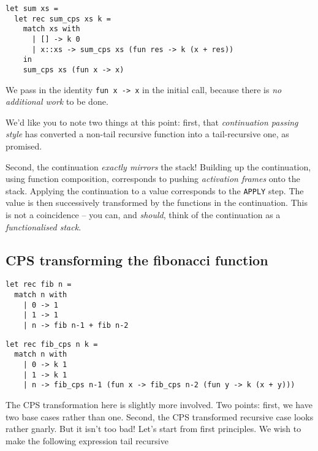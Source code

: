 \begin{code}
\label{code:sum-cps-wrapped-ocaml}
\begin{verbatim}
let sum xs = 
  let rec sum_cps xs k = 
    match xs with
      | [] -> k 0
      | x::xs -> sum_cps xs (fun res -> k (x + res))
    in
    sum_cps xs (fun x -> x)
\end{verbatim}
\end{code}

We pass in the identity \texttt{fun x -> x} in the initial call, because there is \emph{no additional work} to be done. 

We'd like you to note two things at this point: first, that \emph{continuation passing style} has converted a non-tail recursive function into a tail-recursive one, as promised. 

Second, the continuation \emph{exactly mirrors} the stack! Building up the continuation, using function composition, corresponds to pushing \emph{activation frames} onto the stack. Applying the continuation to a value corresponds to the \texttt{APPLY} step. The value is then successively transformed by the functions in the continuation. This is not a coincidence -- you can, and \emph{should}, think of the continuation as a \emph{functionalised stack}. 

\subsection{CPS transforming the fibonacci function}
\begin{code}
\label{code:fib-ocaml-again}
\begin{verbatim}
let rec fib n = 
  match n with
    | 0 -> 1
    | 1 -> 1
    | n -> fib n-1 + fib n-2
\end{verbatim}
\end{code}

\begin{code}
\label{code:fib-ocaml-again}
\begin{verbatim}
let rec fib_cps n k = 
  match n with
    | 0 -> k 1
    | 1 -> k 1
    | n -> fib_cps n-1 (fun x -> fib_cps n-2 (fun y -> k (x + y)))
\end{verbatim}
\end{code}

The CPS transformation here is slightly more involved. Two points: first, we have two base cases rather than one. Second, the CPS transformed recursive case looks rather gnarly. But it isn't too bad! Let's start from first principles. We wish to make the following expression tail recursive 

